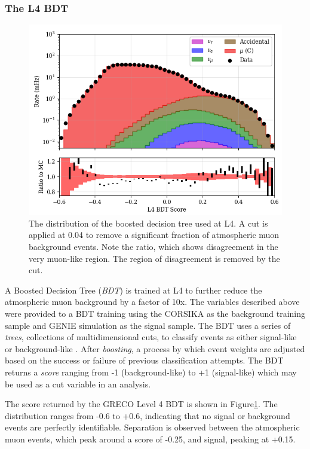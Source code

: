 \subsubsection{The L4 BDT}
\begin{figure}[h]
	\centering
		\includegraphics[width=0.9\linewidth]{BDT_log.png}
		\caption[The L4 BDT Score]{The distribution of the boosted decision tree used at L4. A cut is applied at 0.04 to remove a significant fraction of atmospheric muon background events. Note the ratio, which shows disagreement in the very muon-like region. The region of disagreement is removed by the cut.}
	\label{fig:L4_bdt_log}
\end{figure}

A Boosted Decision Tree (\emph{BDT}) is trained at L4 to further reduce the atmospheric muon background by a factor of 10x. 
The variables described above were provided to a BDT training using the CORSIKA as the background training sample and GENIE simulation as the signal sample. 
The BDT uses a series of \emph{trees}, collections of multidimensional cuts, to classify events as either signal-like or background-like \cite{TMVA}.
After \emph{boosting}, a process by which event weights are adjusted based on the success or failure of previous classification attempts.
The BDT returns a \emph{score} ranging from -1 (background-like) to +1 (signal-like) which may be used as a cut variable in an analysis.

The score returned by the GRECO Level 4 BDT is shown in Figure\ref{fig:L4_bdt_log}.
The distribution ranges from -0.6 to +0.6, indicating that no signal or background events are perfectly identifiable.
Separation is observed between the atmospheric muon events, which peak around a score of -0.25, and signal, peaking at +0.15.

